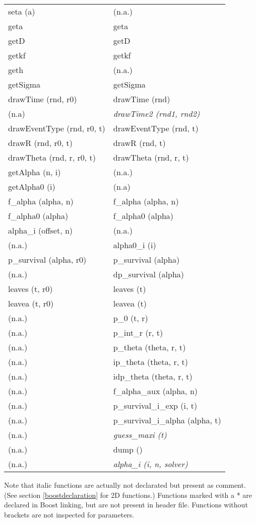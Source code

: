 \documentclass[a4paper,10pt]{article}
\begin{document}
\begin{table}[h!]
\begin{tabular}{ p{} p{} }
    seta (a) & (n.a.) \\
    geta & geta \\
    getD & getD \\
    getkf & getkf \\
    geth & (n.a.) \\ \hline
    getSigma & getSigma \\
    drawTime (rnd, r0) & drawTime (rnd) \\
    (n.a) & \textit{drawTime2 (rnd1, rnd2)} \\
    drawEventType (rnd, r0, t) & drawEventType (rnd, t) \\ 
    drawR (rnd, r0, t) & drawR (rnd, t) \\ \hline 
    drawTheta (rnd, r, r0, t) & drawTheta (rnd, r, t) \\
    getAlpha (n, i) & (n.a.) \\
    getAlpha0 (i) & (n.a) \\
    f\_alpha (alpha, n) & f\_alpha (alpha, n) \\
    f\_alpha0 (alpha) & f\_alpha0 (alpha) \\ \hline
    alpha\_i (offset, n) & (n.a.) \\
    (n.a.) & alpha0\_i  (i) \\
    p\_survival (alpha, r0) & p\_survival (alpha) \\
    (n.a.) & dp\_survival (alpha) \\
    leaves (t, r0) & leaves (t) \\ \hline 
    leavea (t, r0) & leavea (t) \\
    (n.a.) & p\_0 (t, r) \\
    (n.a.) & p\_int\_r (r, t) \\
    (n.a.) & p\_theta (theta, r, t) \\
    (n.a.) & ip\_theta (theta, r, t) \\ \hline
    (n.a.) & idp\_theta (theta, r, t) \\

    (n.a.) & f\_alpha\_aux (alpha, n) \\

    (n.a.) & p\_survival\_i\_exp (i, t) \\
    (n.a.) & p\_survival\_i\_alpha (alpha, t) \\

    (n.a.) & \textit{guess\_maxi (t) } \\ \hline
    (n.a.) & dump () \\
    (n.a.) & \textit{alpha\_i (i, n, solver)} \\  
\end{tabular}

\bigskip 

Note that italic functions are actually not declarated but present as comment. (See section \ref{boostdeclaration} for 2D functions.) Functions marked with a * are declared in Boost linking, but are not present in header file. Functions without brackets are not inspected for parameters.
\end{table}
\end{document}
